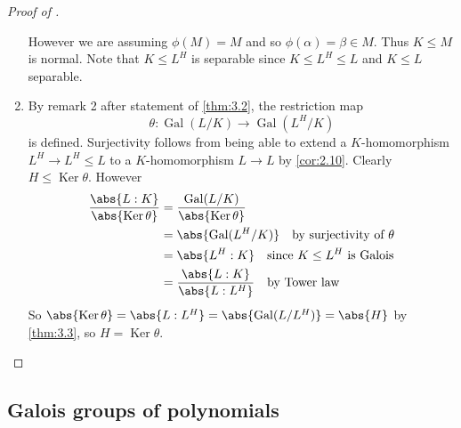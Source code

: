 \documentclass{article}
\DeclareMathOperator{\Gal}{Gal}
\DeclareMathOperator{\Ker}{Ker}
\begin{document}
\begin{proof}[Proof of ]
\begin{enumerate}[label=(\roman*)]
            However we are assuming $\phi(M) = M$ and so $\phi(\alpha) = \beta \in M$. Thus $K \leq M$ is normal.
            Note that $K \leq L^H$ is separable since $K \leq L^H \leq L$ and $K \leq L$ separable.

        \item By remark 2 after statement of \cref{thm:3.2}, the restriction map
            \begin{equation*}\theta:\Gal(L/K) \rightarrow \Gal(L^H/K)\end{equation*}
            is defined.
            Surjectivity follows from being able to extend a $K$-homomorphism $L^H \to L^H \leq L$ to a $K$-homomorphism $L \to L$ by \cref{cor:2.10}.
            Clearly $H \leq \Ker \theta$. However
            \begin{align*}
                \frac{\abs{L:K}}{\abs{\Ker \theta}} &= \frac{\Gal(L/K)}{\abs{\Ker \theta}} \\
                                                    &= \abs{\Gal(L^H/K)} \quad \text{by surjectivity of } \theta \\
                                                    &= \abs{L^H:K} \quad \text{since } K \leq L^H \text{ is Galois} \\
                                                    &= \frac{\abs{L:K}}{\abs{L:L^H}} \quad \text{by Tower law}
            \end{align*}
            So $\abs{\Ker \theta} = \abs{L:L^H} = \abs{\Gal(L/L^H)} = \abs{H}$ by \cref{thm:3.3}, so $H = \Ker \theta$. \qedhere
    \end{enumerate}
\end{proof}
\subsection{Galois groups of polynomials}
\end{document}
